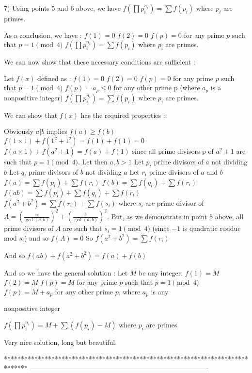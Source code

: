 \begin{mysolution}
$ 7)$ Using points 5 and 6 above, we have $ f(\prod p_i^{n_i})=\sum f(p_i)$ where $ p_i$ are primes.


As a conclusion, we have :
$ f(1)=0$
$ f(2)=0$
$ f(p)=0$ for any prime $ p$ such that $ p=1\pmod{4}$
$ f(\prod p_i^{n_i})=\sum f(p_i)$ where $ p_i$ are primes.

We can now show that these necessary conditions are sufficient : 

Let $ f(x)$ defined as :
$ f(1)=0$
$ f(2)=0$
$ f(p)=0$ for any prime $ p$ such that $ p=1\pmod{4}$
$ f(p)=a_p\leq 0$ for any other prime p (where $ a_p$ is a nonpositive integer)
$ f(\prod p_i^{n_i})=\sum f(p_i)$ where $ p_i$ are primes.

We can show that $ f(x)$ has the required properties :

Obviously $ a|b$ implies $ f(a)\geq f(b)$
$ f(1\times 1)+f(1^2+1^2)=f(1)+f(1)=0$
$ f(a\times 1)+f(a^2+1)=f(a)+f(1)$ since all prime divisors p of $ a^2+1$ are such that $ p=1\pmod{4}$.
Let then $ a,b>1$ 
Let $ p_i$ prime divisors of $ a$ not dividing $ b$
Let $ q_i$ prime divisors of $ b$ not dividing $ a$
Let $ r_i$ prime divisors of $ a$ and $ b$
$ f(a)=\sum f(p_i)+\sum f(r_i)$
$ f(b)=\sum f(q_i)+\sum f(r_i)$
$ f(ab)=\sum f(p_i)+\sum f(q_i)+\sum f(r_i)$
$ f(a^2+b^2)=\sum f(r_i)+\sum f(s_i)$ where $ s_i$ are prime divisor of $ A=(\frac{a}{\gcd(a,b)})^2+(\frac{b}{\gcd(a,b)})^2$. But, as we demonstrate in point  5 above, all prime divisors of $ A$ are such that $ s_i=1\pmod{4}$ (since $ -1$ is quadratic residue mod $ s_i$) and so $ f(A)=0$
So $ f(a^2+b^2)=\sum f(r_i)$

And so $ f(ab)+f(a^2+b^2)=f(a)+f(b)$


And so we have the general solution :
Let $ M$ be any integer.
$ f(1)=M$
$ f(2)=M$
$ f(p)=M$ for any prime $ p$ such that $ p=1\pmod{4}$
$ f(p)=M + a_p$ for any other prime $p$, where $ a_p$ is any \begin{underlined}nonpositive integer\end{underlined}
$ f(\prod p_i^{n_i})=M+\sum (f(p_i)-M)$ where $ p_i$ are primes.
\end{mysolution}



\begin{mysolution}
	Very nice solution, long but beautiful.
\end{mysolution}
*******************************************************************************
-------------------------------------------------------------------------------

